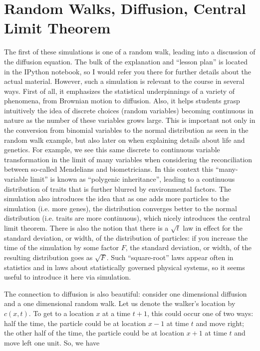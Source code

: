 \documentclass[12pt]{article}
\begin{document}
\section{Random Walks, Diffusion, Central Limit Theorem}
The first of these simulations is one of a random walk, leading into a discussion of the diffusion equation. The bulk of the explanation and ``lesson plan'' is located in the IPython notebook, so I would refer you there for further details about the actual material. However, such a simulation is relevant to the course in several ways. First of all, it emphasizes the statistical underpinnings of a variety of phenomena, from Brownian motion to diffusion. Also, it helps students grasp intuitively the idea of discrete choices (random variables) becoming continuous in nature as the number of these variables grows large. This is important not only in the conversion from binomial variables to the normal distribution as seen in the random walk example, but also later on when explaining details about life and genetics. For example, we see this same discrete to continuous variable transformation in the limit of many variables when considering the reconciliation between so-called Mendelians and biometricians. In this context this ``many-variable limit'' is known as ``polygenic inheritance'', leading to a continuous distribution of traits that is further blurred by environmental factors. The simulation also introduces the idea that as one adds more particles to the simulation (i.e. more genes), the distribution converges better to the normal distribution (i.e. traits are more continuous), which nicely introduces the central limit theorem. There is also the notion that there is a $\sqrt{t}$ law in effect for the standard deviation, or width, of the distribution of particles: if you increase the time of the simulation by some factor $F$, the standard deviation, or width, of the resulting distribution goes as $\sqrt{F}$. Such ``square-root'' laws appear often in statistics and in laws about statistically governed physical systems, so it seems useful to introduce it here via simulation.

The connection to diffusion is also beautiful: consider one dimensional diffusion and a one dimensional random walk. Let us denote the walker's location by $c(x, t)$. To get to a location $x$ at a time $t+1$, this could occur one of two ways: half the time, the particle could be at location $x-1$ at time $t$ and move right; the other half of the time, the particle could be at location $x+1$ at time $t$ and move left one unit. So, we have
\end{document}
